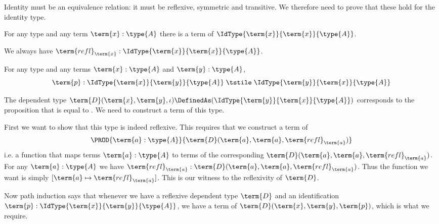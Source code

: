 Identity must be an equivalence relation: it must be reflexive, symmetric and transitive.  We therefore need to prove that these hold for the identity type.

\begin{Theorem}
For any type  and any term $\term{x}:\type{A}$ there is a term of $\IdType{\term{x}}{\term{x}}{\type{A}}$.
\end{Theorem}
\begin{Proof}
We always have
$\term{refl}_{\term{x}}:
\IdType{\term{x}}{\term{x}}{\type{A}}$.
\end{Proof}



\begin{Theorem}
For any type  and any terms $\term{x}:\type{A}$ and $\term{y}:\type{A}$,
\[
\term{p}:\IdType{\term{x}}{\term{y}}{\type{A}}
\;\tstile \;
\IdType{\term{y}}{\term{x}}{\type{A}}
\]
\end{Theorem}

\begin{Proof}
The dependent type 
$\term{D}(\term{x},\term{y},\iota) \DefinedAs (\IdType{\term{y}}{\term{x}}{\type{A}})$ corresponds to the proposition that  is equal to .  We need to construct a term of this type.  

First we want to show that this type is indeed reflexive.  This requires that we construct a term of 
\[
\PROD{\term{a}:\type{A}}
{\term{D}(\term{a},\term{a},\term{refl}_{\term{a}})}
\]
i.e. a function that maps terms $\term{a}:\type{A}$ to terms of the corresponding ${\term{D}(\term{a},\term{a},\term{refl}_{\term{a}})}$.
For any $\term{a}:\type{A}$ we have 
$\term{refl}_{\term{a}}: \term{D}(\term{a},\term{a},\term{refl}_{\term{a}})$.  Thus the function we want is simply $[\term{a} \mapsto \term{refl}_{\term{a}}]$.  This is our witness to the reflexivity of $\term{D}$.

Now path induction says that whenever we have a reflexive dependent type $\term{D}$ and an identification $\term{p}:\IdType{\term{x}}{\term{y}}{\type{A}}$, we have a term of 
$\term{D}(\term{x},\term{y},\term{p})$, which is what we require.
\end{Proof}




%





